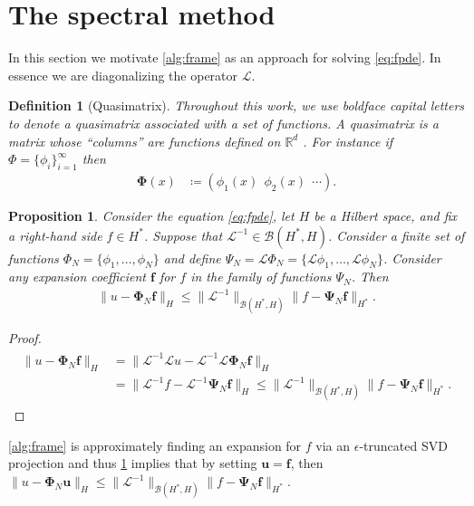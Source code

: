 \documentclass[10pt,a4paper]{article}
\newtheorem{proposition}{Proposition}[section]
\newtheorem{definition}{Definition}[section]
\numberwithin{equation}{section}
\begin{document}
\section{The spectral method}
\label{sec:spectral-method}
In this section  we motivate \cref{alg:frame} as an approach for solving \cref{eq:fpde}. In essence we are diagonalizing the operator $\mathcal{L}$.

\begin{definition}[Quasimatrix]
Throughout this work, we use boldface capital letters to denote a quasimatrix associated with a set of functions. A quasimatrix is a matrix whose ``columns'' are functions defined on $\mathbb{R}^d$ \cite[Lec.~5]{Stewart1998}. For instance if $\Phi = \{\phi_i\}_{i=1}^\infty$ then
\begin{align}
{\bm \Phi}(x) &\coloneqq 
\left( 
\phi_1(x) \ \  \phi_2(x) \ \ \cdots
\right).
\end{align}
\end{definition}


\begin{proposition}
\label{prop:apriori2}
Consider the equation \cref{eq:fpde}, let $H$ be a Hilbert space, and fix a right-hand side $f \in H^*$. Suppose that $\mathcal{L}^{-1} \in \mathcal{B}(H^*, H)$. Consider a  finite set of functions  $\Phi_N = \{\phi_1, \dots, \phi_N\}$ and define $\Psi_N = \mathcal{L} \Phi_N = \{\mathcal{L}\phi_1, \dots, \mathcal{L}\phi_N\}$. Consider any expansion coefficient ${\mathbf f}$ for $f$ in the family of functions $\Psi_N$. Then
\begin{align}
\| u - {\bm \Phi}_N {\mathbf f} \|_H \leq \| \mathcal{L}^{-1}\|_{\mathcal{B}(H^*, H)} \| f - {\bm \Psi}_N {\mathbf f} \|_{H^*}.
\end{align}
\end{proposition}
\begin{proof}
\begin{align}
\begin{split}
\| u - {\bm \Phi}_N {\mathbf f} \|_H 
&= \| \mathcal{L}^{-1} \mathcal{L}u - \mathcal{L}^{-1} \mathcal{L} {\bm \Phi}_N {\mathbf f} \|_H \\
&= \| \mathcal{L}^{-1} f- \mathcal{L}^{-1} {\bm \Psi}_N {\mathbf f} \|_H
\leq \| \mathcal{L}^{-1}\|_{\mathcal{B}(H^*, H)} \| f - {\bm \Psi}_N {\mathbf f} \|_{H^*}.
\end{split}
\end{align}
\end{proof}
\cref{alg:frame} is approximately finding an expansion for $f$  via an $\epsilon$-truncated SVD projection and thus \cref{prop:apriori2} implies that by setting ${\mathbf u} = {\mathbf f}$, then $\| u - {\bm \Phi}_N {\mathbf u} \|_H  \leq \| \mathcal{L}^{-1}\|_{\mathcal{B}(H^*, H)} \| f - {\bm \Psi}_N {\mathbf f} \|_{H^*}$. 
\end{document}
